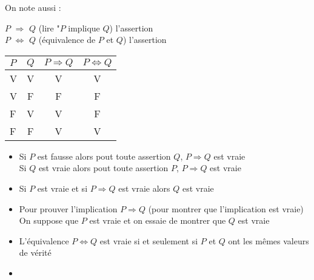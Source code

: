 \documentclass[12pt, a4paper]{report}
\begin{document}
On note aussi : 
\begin{center}
    $P$ $\Longrightarrow$ $Q$ (lire "$P$ implique $Q$) l'assertion \\
    $P$ $\Longleftrightarrow$ $Q$ (équivalence de $P$ et $Q$) l'assertion 
\end{center}
\begin{center}
    \begin{tabular}{|l|c|c|c|}
      \hline
      $P$ & $Q$ & $P\Longrightarrow Q$ & $P\Longleftrightarrow Q$ \\
      \hline
      V & V & V & V \\
      \hline
      V & F & F & F\\
      \hline
      F & V & V & F\\
      \hline
      F & F & V & V \\
      \hline
      \end{tabular}
\end{center}

\begin{remarque}
\begin{itemize}
    \item Si $P$ est fausse alors pout toute assertion $Q$, $P\Longrightarrow Q$ est vraie \\
    Si $Q$ est vraie alors pout toute assertion $P$, $P\Longrightarrow Q$ est vraie 
    \item {}
    Si $P$ est vraie et si $P\Longrightarrow Q$ est vraie alors $Q$ est vraie
    \item Pour prouver l'implication $P\Longrightarrow Q$ (\ie pour montrer que l'implication est vraie)\\
    On suppose que $P$ est vraie et on essaie de montrer que $Q$ est vraie
    \item L'équivalence $P\Longleftrightarrow Q$ est vraie si et seulement si $P$ et $Q$ ont les mêmes valeurs de vérité
    \item {}
    \begin{itemize}
    \end{itemize}
\end{itemize}
\end{remarque}
\end{document}
